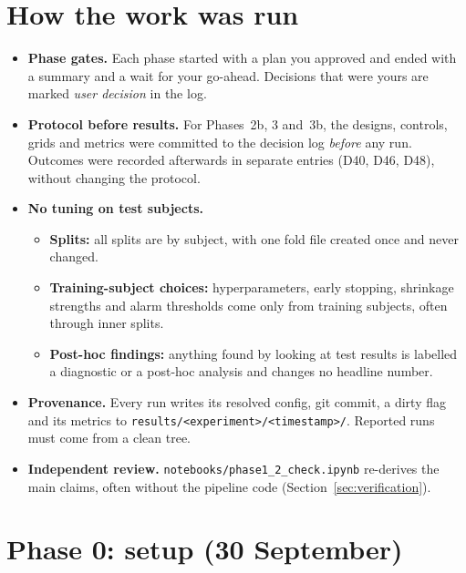 \documentclass[11pt,a4paper]{article}
\newcommand{\code}[1]{\texttt{#1}}
\newcommand{\D}[1]{D#1}
\begin{document}
\section{How the work was run}

\begin{itemize}
\item \textbf{Phase gates.} Each phase started with a plan you approved and ended with a summary
and a wait for your go-ahead. Decisions that were yours are marked \emph{user decision} in the
log.
\item \textbf{Protocol before results.} For Phases~2b, 3 and~3b, the designs, controls, grids
and metrics were committed to the decision log \emph{before} any run. Outcomes were recorded
afterwards in separate entries (\D{40}, \D{46}, \D{48}), without changing the protocol.
\item \textbf{No tuning on test subjects.}
  \begin{itemize}
  \item \textbf{Splits:} all splits are by subject, with one fold file created once and never
  changed.
  \item \textbf{Training-subject choices:} hyperparameters, early stopping, shrinkage strengths
  and alarm thresholds come only from training subjects, often through inner splits.
  \item \textbf{Post-hoc findings:} anything found by looking at test results is labelled a
  diagnostic or a post-hoc analysis and changes no headline number.
  \end{itemize}
\item \textbf{Provenance.} Every run writes its resolved config, git commit, a dirty flag and its
metrics to \code{results/<experiment>/<timestamp>/}. Reported runs must come from a clean tree.
\item \textbf{Independent review.} \code{notebooks/phase1\_2\_check.ipynb} re-derives the main
claims, often without the pipeline code (Section~\ref{sec:verification}).
\end{itemize}

\section{Phase 0: setup (30 September)}
\end{document}
